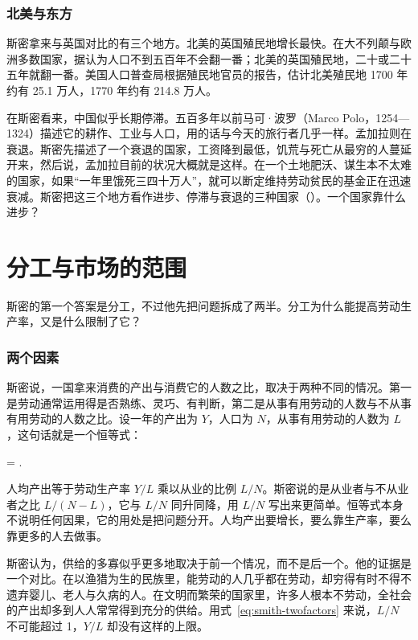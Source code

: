 \subsubsection{北美与东方}
斯密拿来与英国对比的有三个地方。北美的英国殖民地增长最快。在大不列颠与欧洲多数国家，据认为人口不到五百年不会翻一番；北美的英国殖民地，二十或二十五年就翻一番\cite{smith1776}。美国人口普查局根据殖民地官员的报告，估计北美殖民地 1700 年约有 25.1 万人，1770 年约有 214.8 万人\cite{census1975}。

在斯密看来，中国似乎长期停滞。五百多年以前马可·波罗（Marco Polo，1254—1324）描述它的耕作、工业与人口，用的话与今天的旅行者几乎一样\cite{smith1776}。孟加拉则在衰退。斯密先描述了一个衰退的国家，工资降到最低，饥荒与死亡从最穷的人蔓延开来，然后说，孟加拉目前的状况大概就是这样。在一个土地肥沃、谋生本不太难的国家，如果“一年里饿死三四十万人”，就可以断定维持劳动贫民的基金正在迅速衰减\cite{smith1776}。斯密把这三个地方看作进步、停滞与衰退的三种国家（）。一个国家靠什么进步？

\section{分工与市场的范围}\label{sec:smith-division}

斯密的第一个答案是分工，不过他先把问题拆成了两半。分工为什么能提高劳动生产率，又是什么限制了它？

\subsubsection{两个因素}
斯密说，一国拿来消费的产出与消费它的人数之比，取决于两种不同的情况。第一是劳动通常运用得是否熟练、灵巧、有判断，第二是从事有用劳动的人数与不从事有用劳动的人数之比\cite{smith1776}。设一年的产出为 $Y$，人口为 $N$，从事有用劳动的人数为 $L$，这句话就是一个恒等式：
\begin{keyeq}
=\cdot{} .\label{eq:smith-twofactors}
\end{keyeq}
人均产出等于劳动生产率 $Y/L$ 乘以从业的比例 $L/N$。斯密说的是从业者与不从业者之比 $L/(N-L)$，它与 $L/N$ 同升同降，用 $L/N$ 写出来更简单。恒等式本身不说明任何因果，它的用处是把问题分开。人均产出要增长，要么靠生产率，要么靠更多的人去做事。

斯密认为，供给的多寡似乎更多地取决于前一个情况，而不是后一个\cite{smith1776}。他的证据是一个对比。在以渔猎为生的民族里，能劳动的人几乎都在劳动，却穷得有时不得不遗弃婴儿、老人与久病的人。在文明而繁荣的国家里，许多人根本不劳动，全社会的产出却多到人人常常得到充分的供给\cite{smith1776}。用式~\eqref{eq:smith-twofactors} 来说，$L/N$ 不可能超过 1，$Y/L$ 却没有这样的上限。

